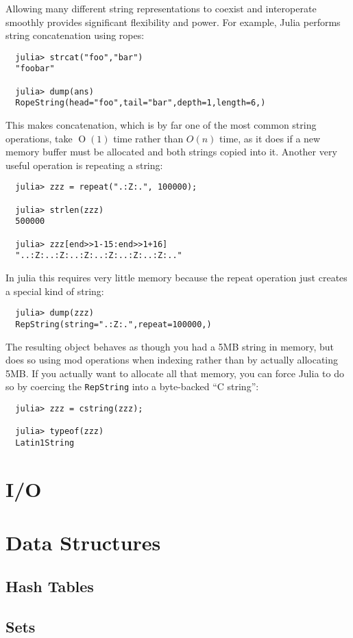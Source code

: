 \documentclass{article}
\renewcommand{\O}{\ensuremath{\operatorname{O}}}
\begin{document}
Allowing many different string representations to coexist and interoperate smoothly provides significant flexibility and power.
For example, Julia performs string concatenation using ropes:
\begin{verbatim}
  julia> strcat("foo","bar")
  "foobar"

  julia> dump(ans)
  RopeString(head="foo",tail="bar",depth=1,length=6,)
\end{verbatim}
This makes concatenation, which is by far one of the most common string operations, take $\O(1)$ time rather than $O(n)$ time, as it does if a new memory buffer must be allocated and both strings copied into it.
Another very useful operation is repeating a string:
\begin{verbatim}
  julia> zzz = repeat(".:Z:.", 100000);

  julia> strlen(zzz)
  500000

  julia> zzz[end>>1-15:end>>1+16]
  "..:Z:..:Z:..:Z:..:Z:..:Z:..:Z:.."
\end{verbatim}
In julia this requires very little memory because the repeat operation just creates a special kind of string:
\begin{verbatim}
  julia> dump(zzz)
  RepString(string=".:Z:.",repeat=100000,)
\end{verbatim}
The resulting object behaves as though you had a 5MB string in memory, but does so using mod operations when indexing rather than by actually allocating 5MB.
If you actually want to allocate all that memory, you can force Julia to do so by coercing the \verb|RepString| into a byte-backed ``C string'':
\begin{verbatim}
  julia> zzz = cstring(zzz);

  julia> typeof(zzz)
  Latin1String
\end{verbatim}

\section{I/O}
\section{Data Structures}
\subsection{Hash Tables}
\subsection{Sets}
\end{document}
